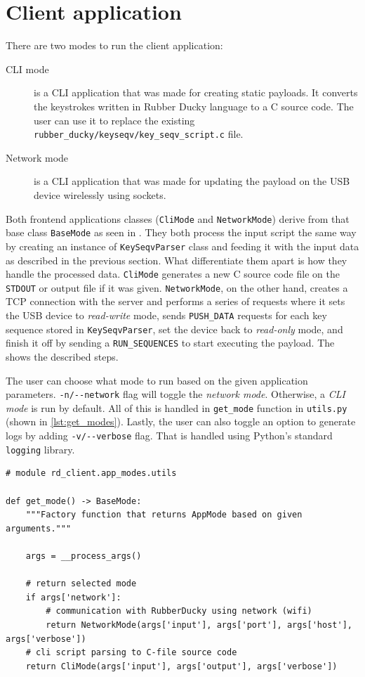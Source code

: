 \section{Client application}
There are two modes to run the client application:
\begin{description}
    \item [CLI mode] is a CLI application that was made for creating static payloads. It converts the keystrokes written in Rubber Ducky language to a C source code. The user can use it to replace the existing \verb|rubber_ducky/keyseqv/key_seqv_script.c| file.
    \item [Network mode] is a CLI application that was made for updating the payload on the USB device wirelessly using sockets.
\end{description}
Both frontend applications classes (\verb|CliMode| and \verb|NetworkMode|) derive from that base class \verb|BaseMode| as seen in . They both process the input script the same way by creating an instance of \verb|KeySeqvParser| class and feeding it with the input data as described in the previous section. What differentiate them apart is how they handle the processed data. \verb|CliMode| generates a new C source code file on the \verb|STDOUT| or output file if it was given. \verb|NetworkMode|, on the other hand, creates a TCP connection with the server and performs a series of requests where it sets the USB device to \emph{read-write} mode, sends \verb|PUSH_DATA| requests for each key sequence stored in \verb|KeySeqvParser|, set the device back to \emph{read-only} mode, and finish it off by sending a \verb|RUN_SEQUENCES| to start executing the payload. The  shows the described steps.

The user can choose what mode to run based on the given application parameters. \verb|-n/--network| flag will toggle the \emph{network mode}. Otherwise, a \emph{CLI mode} is run by default. All of this is handled in \verb|get_mode| function in \verb|utils.py| (shown in \autoref{lst:get_modes}). Lastly, the user can also toggle an option to generate logs by adding \verb|-v/--verbose| flag. That is handled using Python's standard \verb|logging| library.

\begin{lstlisting}
# module rd_client.app_modes.utils

def get_mode() -> BaseMode:
    """Factory function that returns AppMode based on given arguments."""

    args = __process_args()

    # return selected mode
    if args['network']:
        # communication with RubberDucky using network (wifi)
        return NetworkMode(args['input'], args['port'], args['host'], args['verbose'])
    # cli script parsing to C-file source code
    return CliMode(args['input'], args['output'], args['verbose'])
\end{lstlisting}


